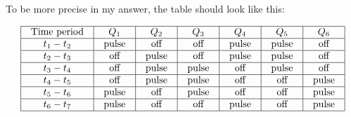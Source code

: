 To be more precise in my answer, the table should look like this:


$$\vbox{\offinterlineskip
\halign{\strut
\vrule \quad\hfil # \ \hfil & 
\vrule \quad\hfil # \ \hfil & 
\vrule \quad\hfil # \ \hfil & 
\vrule \quad\hfil # \ \hfil & 
\vrule \quad\hfil # \ \hfil & 
\vrule \quad\hfil # \ \hfil & 
\vrule \quad\hfil # \ \hfil \vrule \cr
\noalign{\hrule}
%
Time period & $Q_1$ & $Q_2$ & $Q_3$ & $Q_4$ & $Q_5$ & $Q_6$ \cr
%
\noalign{\hrule}
%
$t_1 - t_2$ & pulse & off & off & pulse & pulse & off \cr
%
\noalign{\hrule}
%
$t_2 - t_3$ & off & pulse & off & pulse & pulse & off \cr
%
\noalign{\hrule}
%
$t_3 - t_4$ & off & pulse & pulse & off & pulse & off \cr
%
\noalign{\hrule}
%
$t_4 - t_5$ & off & pulse & pulse & off & off & pulse \cr
%
\noalign{\hrule}
%
$t_5 - t_6$ & pulse & off & pulse & off & off & pulse \cr
%
\noalign{\hrule}
%
$t_6 - t_7$ & pulse & off & off & pulse & off & pulse \cr
%
\noalign{\hrule}
} %
}$$ %











